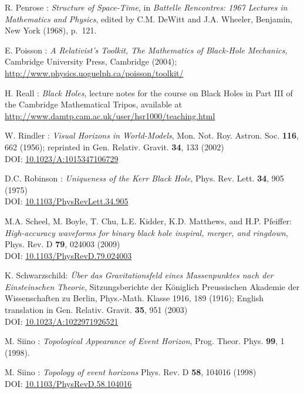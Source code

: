\begin{thebibliography}{123}
R. Penrose : {\em Structure of Space-Time},
in {\em Battelle Rencontres: 1967 Lectures in Mathematics and Physics},
edited by C.M. DeWitt and J.A. Wheeler,
Benjamin, New York (1968), p.~121.

E. Poisson : \emph{A Relativist's Toolkit,
The Mathematics of Black-Hole Mechanics},
Cambridge University Press, Cambridge (2004); \\
\url{http://www.physics.uoguelph.ca/poisson/toolkit/}

H. Reall : {\em Black Holes}, lecture notes for the course on Black Holes in
Part III of the Cambridge Mathematical Tripos, available at \\
\url{http://www.damtp.cam.ac.uk/user/hsr1000/teaching.html}

W. Rindler : {\em Visual Horizons in World-Models},
Mon. Not. Roy. Astron. Soc. {\bf 116}, 662 (1956);
reprinted in Gen. Relativ. Gravit. {\bf 34}, 133 (2002)\\
DOI: \href{http://dx.doi.org/doi:10.1023/A:1015347106729}{10.1023/A:1015347106729}

D.C. Robinson : {\em Uniqueness of the Kerr Black Hole},
Phys. Rev. Lett. {\bf 34}, 905 (1975)\\
DOI: \href{http://dx.doi.org/10.1103/PhysRevLett.34.905}{10.1103/PhysRevLett.34.905}

M.A. Scheel, M. Boyle, T. Chu, L.E. Kidder, K.D. Matthews, and H.P. Pfeiffer:
{\em High-accuracy waveforms for binary black hole inspiral, merger, and ringdown},
Phys. Rev. D {\bf 79}, 024003 (2009)\\
DOI: \href{http://dx.doi.org/10.1103/PhysRevD.79.024003}{10.1103/PhysRevD.79.024003}

K. Schwarzschild:
{\em \"Uber das Gravitationsfeld eines Massenpunktes nach der Einsteinschen Theorie},
Sitzungsberichte der K\"oniglich Preussischen Akademie der Wissenschaften zu Berlin, Phys.-Math. Klasse 1916, 189 (1916);
English translation in Gen. Relativ. Gravit. {\bf 35}, 951 (2003)\\
DOI: \href{http://dx.doi.org/10.1023/A:1022971926521}{10.1023/A:1022971926521}

M. Siino : {\em Topological Appearance of Event Horizon},
Prog. Theor. Phys. {\bf 99}, 1 (1998).

M. Siino : {\em Topology of event horizons}
Phys. Rev. D {\bf 58}, 104016 (1998)\\
DOI: \href{http://dx.doi.org/10.1103/PhysRevD.58.104016}{10.1103/PhysRevD.58.104016}


\end{thebibliography}

